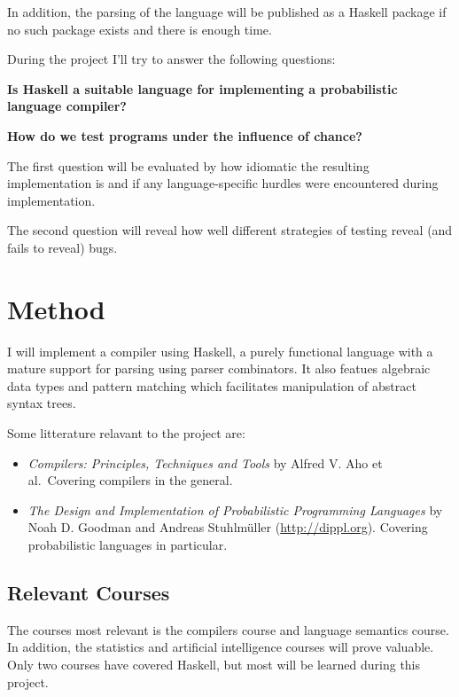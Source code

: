 \documentclass[a4paper, parskip]{scrartcl}
\begin{document}
In addition, the parsing of the language will be published as a Haskell package
if no such package exists and there is enough time.



During the project I'll try to answer the following questions:

\textbf{Is Haskell a suitable language for implementing a probabilistic
language compiler?}

\textbf{How do we test programs under the influence of chance?}

The first question will be evaluated by how idiomatic the resulting
implementation is and if any language-specific hurdles were encountered during
implementation.

The second question will reveal how well different strategies of testing reveal
(and fails to reveal) bugs.

\section{Method}
\label{sec:method}

I will implement a compiler using Haskell, a purely functional language with a
mature support for parsing using parser combinators. It also featues algebraic
data types and pattern matching which facilitates manipulation of abstract
syntax trees.

Some litterature relavant to the project are:
\begin{itemize}
\item \emph{Compilers: Principles,
  Techniques and Tools} by Alfred V. Aho et al.\ Covering compilers in the
  general. 

  \item \emph{The Design and Implementation of Probabilistic Programming
    Languages} by Noah D. Goodman and Andreas Stuhlmüller
    (\url{http://dippl.org}). Covering
    probabilistic languages in particular.
\end{itemize}


\subsection{Relevant Courses}
\label{sec:relevant_courses}

The courses most relevant is the compilers course and language semantics
course. In addition, the statistics and artificial intelligence courses will
prove valuable. Only two courses have covered Haskell, but most will be learned
during this project.
\end{document}
